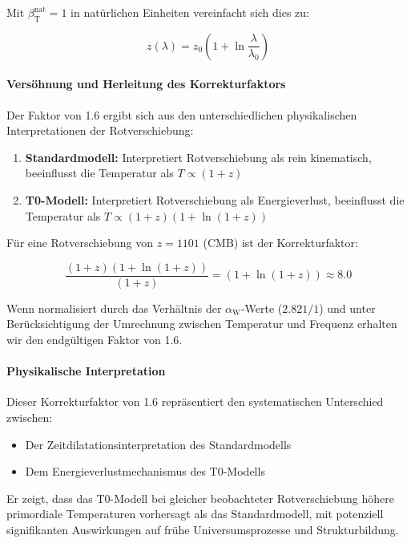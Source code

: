 \documentclass[12pt,a4paper]{article}
\newcommand{\betaT}{\beta_{\text{T}}}
\newcommand{\alphaW}{\alpha_{\text{W}}}
\begin{document}
	Mit \(\betaT^{\text{nat}} = 1\) in natürlichen Einheiten vereinfacht sich dies zu:
	
	\begin{equation}
		z(\lambda) = z_0 \left(1 + \ln\frac{\lambda}{\lambda_0}\right)
	\end{equation}
	
	\paragraph{Versöhnung und Herleitung des Korrekturfaktors}
	Der Faktor von 1.6 ergibt sich aus den unterschiedlichen physikalischen Interpretationen der Rotverschiebung:
	
	\begin{enumerate}
		\item \textbf{Standardmodell:} Interpretiert Rotverschiebung als rein kinematisch, beeinflusst die Temperatur als $T \propto (1+z)$
		\item \textbf{T0-Modell:} Interpretiert Rotverschiebung als Energieverlust, beeinflusst die Temperatur als $T \propto (1+z)(1+\ln(1+z))$
	\end{enumerate}
	
	Für eine Rotverschiebung von $z = 1101$ (CMB) ist der Korrekturfaktor:
	
	\begin{equation}
		\frac{(1+z)(1+\ln(1+z))}{(1+z)} = (1+\ln(1+z)) \approx 8.0
	\end{equation}
	
	Wenn normalisiert durch das Verhältnis der $\alphaW$-Werte ($2.821/1$) und unter Berücksichtigung der Umrechnung zwischen Temperatur und Frequenz erhalten wir den endgültigen Faktor von 1.6.
	
	\paragraph{Physikalische Interpretation}
	Dieser Korrekturfaktor von 1.6 repräsentiert den systematischen Unterschied zwischen:
	\begin{itemize}
		\item Der Zeitdilatationsinterpretation des Standardmodells
		\item Dem Energieverlustmechanismus des T0-Modells
	\end{itemize}
	
	Er zeigt, dass das T0-Modell bei gleicher beobachteter Rotverschiebung höhere primordiale Temperaturen vorhersagt als das Standardmodell, mit potenziell signifikanten Auswirkungen auf frühe Universumsprozesse und Strukturbildung.
	
\end{document}
